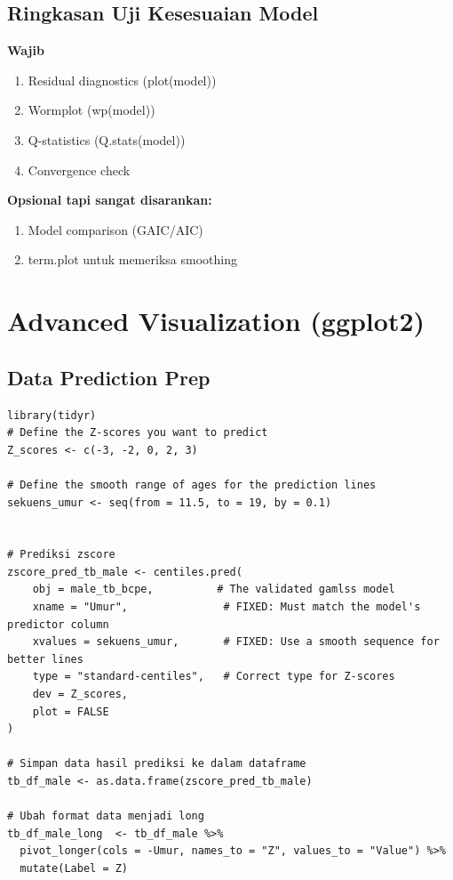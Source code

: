 \documentclass[11pt, a4paper]{article}
\begin{document}
\subsection{Ringkasan Uji Kesesuaian Model}
\textbf{Wajib}
\begin{enumerate}
    \item Residual diagnostics (plot(model))
    \item Wormplot (wp(model))
    \item Q-statistics (Q.stats(model))
    \item Convergence check
\end{enumerate}
\textbf{Opsional tapi sangat disarankan:}
\begin{enumerate}
    \item Model comparison (GAIC/AIC)
    \item term.plot untuk memeriksa smoothing
\end{enumerate}

\section{Advanced Visualization (ggplot2)}

\subsection{Data Prediction Prep}
\begin{lstlisting}
library(tidyr)
# Define the Z-scores you want to predict
Z_scores <- c(-3, -2, 0, 2, 3)

# Define the smooth range of ages for the prediction lines
sekuens_umur <- seq(from = 11.5, to = 19, by = 0.1)


# Prediksi zscore
zscore_pred_tb_male <- centiles.pred(
    obj = male_tb_bcpe,          # The validated gamlss model
    xname = "Umur",               # FIXED: Must match the model's predictor column
    xvalues = sekuens_umur,       # FIXED: Use a smooth sequence for better lines
    type = "standard-centiles",   # Correct type for Z-scores
    dev = Z_scores,
    plot = FALSE
)

# Simpan data hasil prediksi ke dalam dataframe
tb_df_male <- as.data.frame(zscore_pred_tb_male)

# Ubah format data menjadi long
tb_df_male_long  <- tb_df_male %>%
  pivot_longer(cols = -Umur, names_to = "Z", values_to = "Value") %>%
  mutate(Label = Z)
\end{lstlisting}
\end{document}
